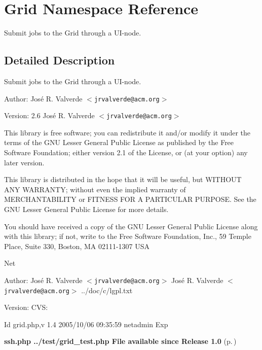 \section{Grid Namespace Reference}
\label{namespaceGrid}
Submit jobs to the Grid through a UI-node.  




\subsection{Detailed Description}
Submit jobs to the Grid through a UI-node. 

\begin{Desc}
\item[Author:]Jos\'{e} R. Valverde $<${\tt jrvalverde@acm.org}$>$ \end{Desc}
\begin{Desc}
\item[Version:]2.6  Jos\'{e} R. Valverde $<${\tt jrvalverde@acm.org}$>$\end{Desc}
This library is free software; you can redistribute it and/or modify it under the terms of the GNU Lesser General Public License as published by the Free Software Foundation; either version 2.1 of the License, or (at your option) any later version.

This library is distributed in the hope that it will be useful, but WITHOUT ANY WARRANTY; without even the implied warranty of MERCHANTABILITY or FITNESS FOR A PARTICULAR PURPOSE. See the GNU Lesser General Public License for more details.

You should have received a copy of the GNU Lesser General Public License along with this library; if not, write to the Free Software Foundation, Inc., 59 Temple Place, Suite 330, Boston, MA 02111-1307 USA

Net \begin{Desc}
\item[Author:]Jos\'{e} R. Valverde $<${\tt jrvalverde@acm.org}$>$  Jos\'{e} R. Valverde $<${\tt jrvalverde@acm.org}$>$  ../doc/c/lgpl.txt \end{Desc}
\begin{Desc}
\item[Version:]CVS: \begin{Desc}
\item[Id]grid.php,v 1.4 2005/10/06 09:35:59 netadmin Exp \end{Desc}
{\bf ssh.php  ../test/grid\_\-test.php  File available since Release 1.0 }{\rm (p.\,\pageref{})}\end{Desc}


